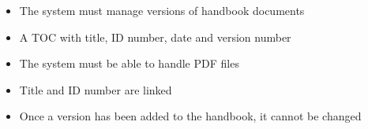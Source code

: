 \begin{itemize}
\item
The system must manage versions of handbook documents
\item
A TOC with title, ID number, date and version number
\item
The system must be able to handle PDF files
\item
Title and ID number are linked
\item
Once a version has been added to the handbook, it cannot be changed
\end{itemize}

